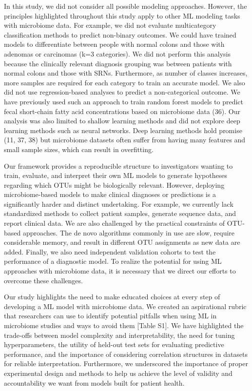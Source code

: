\documentclass[11pt,]{article}
\begin{document}
In this study, we did not consider all possible modeling approaches.
However, the principles highlighted throughout this study apply to other
ML modeling tasks with microbiome data. For example, we did not evaluate
multicategory classification methods to predict non-binary outcomes. We
could have trained models to differentiate between people with normal
colons and those with adenomas or carcinomas (k=3 categories). We did
not perform this analysis because the clinically relevant diagnosis
grouping was between patients with normal colons and those with SRNs.
Furthermore, as number of classes increases, more samples are required
for each category to train an accurate model. We also did not use
regression-based analyses to predict a non-categorical outcome. We have
previously used such an approach to train random forest models to
predict fecal short-chain fatty acid concentrations based on microbiome
data (36). Our analysis was also limited to shallow learning methods and
did not explore deep learning methods such as neural networks. Deep
learning methods hold promise (11, 37, 38) but microbiome datasets often
suffer from having many features and small sample sizes, which can
result in overfitting.

Our framework provides a reproducible structure to investigators wanting
to train, evaluate, and interpret their own ML models to generate
hypotheses regarding which OTUs might be biologically relevant. However,
deploying microbiome-based models to make clinical diagnoses or
predictions is a significantly harder and distinct undertaking. For
example, we currently lack standardized methods to collect patient
samples, generate sequence data, and report clinical data. We are also
challenged by the practical constraints of OTU-based approaches. The de
novo algorithms commonly in use are slow, require considerable memory,
and result in different OTU assignments as new data are added. Finally,
we also need independent validation cohorts to test the performance of a
diagnostic model. To realize the potential for using ML approaches with
microbiome data, it is necessary that we direct our efforts to overcome
these challenges.

Our study highlights the need to make educated choices at every step of
developing a ML model with microbiome data. We created an aspirational
rubric that researchers can use to identify potential pitfalls when
using ML in microbiome studies and ways to avoid them {[}Table S1{]}. We
have highlighted the trade-offs between model complexity and
interpretability, the need for tuning hyperparameters, the utility of
held-out test sets for evaluating predictive performance, and the
importance of considering correlation structures in datasets for
reliable interpretation. Furthermore, we underscored the importance of
proper experimental design and methods to help us achieve the level of
validity and accountability we want from models built for patient
health.
\end{document}
